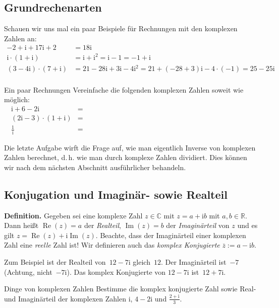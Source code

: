 \documentclass{zirkelblatt1415}
\newcommand{\RR}{\mathbb{R}}
\newcommand{\CC}{\mathbb{C}}
\newcommand{\ii}{\mathrm{i}}
\renewcommand{\Re}{\operatorname{Re}}
\renewcommand{\Im}{\operatorname{Im}}
\newcommand{\ol}[1]{\overline{#1}}
\begin{document}
\subsection{Grundrechenarten}

Schauen wir uns mal ein paar Beispiele für Rechnungen mit den komplexen Zahlen an:
\begin{align*}
  -2+\ii+17\ii+2&=18\ii \\
  \ii\cdot(1+\ii)&=\ii+\ii^2=\ii-1=-1+\ii\\
  (3-4\ii)\cdot(7+\ii)&=21-28\ii+3\ii-4\ii^2=21+(-28+3)\ii-4\cdot(-1)=25-25\ii\\
\end{align*}

\begin{aufgabe}{Ein paar Rechnungen}
  Vereinfache die folgenden komplexen Zahlen soweit wie möglich:
  \begin{align*}
    \ii+6-2\ii&= \hspace{10cm}\\[0.4em]
    (2\ii-3)\cdot(1+\ii)&= \\[0.4em]
    \frac{1}{\ii}&=
  \end{align*}
\end{aufgabe}
Die letzte Aufgabe wirft die Frage auf, wie man eigentlich Inverse von komplexen Zahlen berechnet, d.\,h. wie man durch komplexe Zahlen dividiert. Dies k\"onnen wir nach dem n\"achsten Abschnitt ausf\"uhrlicher behandeln.

\subsection{Konjugation und Imaginär- sowie Realteil}

\textbf{Definition.} Gegeben sei eine komplexe Zahl $z\in\CC$ mit $z=a+\ii b$ mit $a,b\in \RR$. Dann hei\ss t $\Re(z)=a$ der \emph{Realteil}, $\Im(z)=b$ der \emph{Imagin\"arteil} von $z$ und es gilt $z=\Re(z)+\ii \Im(z)$. Beachte, dass der Imaginärteil einer komplexen Zahl eine \emph{reelle} Zahl ist! Wir definieren auch das \emph{komplex Konjugierte} $\ol{z}:=a-\ii b$.

Zum Beispiel ist der Realteil von~$12 - 7\ii$ gleich~$12$. Der Imaginärteil ist~$-7$ (Achtung, nicht~$-7\ii$). Das komplex Konjugierte von $12-7 \ii$ ist~$12 + 7\ii$.

\begin{aufgabe}{Dinge von komplexen Zahlen}
  Bestimme die komplex konjugierte Zahl sowie Real- und Imaginärteil der komplexen Zahlen $\ii$, $4-2\ii$ und $\frac{2+\ii}{3}$.
\end{aufgabe}
\end{document}
